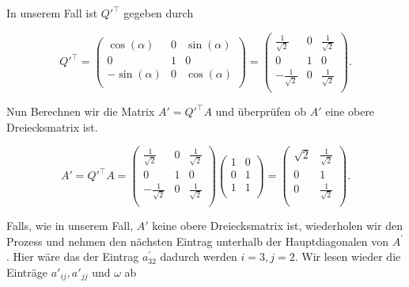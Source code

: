 In unserem Fall ist \( Q'^\top \) gegeben durch

\begin{equation*}
    Q'^\top = \begin{pmatrix}
        \cos(\alpha) & 0 & \sin(\alpha) \\
        0 & 1 & 0 \\
        - \sin(\alpha) & 0 & \cos(\alpha) \\
    \end{pmatrix} =
    \begin{pmatrix}
        \frac{1}{\sqrt{2}} & 0 & \frac{1}{\sqrt{2}} \\
        0 & 1 & 0 \\
        -\frac{1}{\sqrt{2}} & 0 & \frac{1}{\sqrt{2}} \\
    \end{pmatrix}.
\end{equation*}

Nun Berechnen wir die Matrix \( A' = Q'^\top A \) und überprüfen ob \( A' \) eine obere Dreiecksmatrix ist.

\begin{equation*}
    A' = Q'^\top A = 
    \begin{pmatrix}
        \frac{1}{\sqrt{2}} & 0 & \frac{1}{\sqrt{2}} \\
        0 & 1 & 0 \\
        -\frac{1}{\sqrt{2}} & 0 & \frac{1}{\sqrt{2}} \\
    \end{pmatrix}
    \begin{pmatrix}
        1 & 0 \\
        0 & 1 \\
        1 & 1 \\
    \end{pmatrix} = 
    \begin{pmatrix}
        \sqrt{2} & \frac{1}{\sqrt{2}} \\
        0 & 1 \\
        0 & \frac{1}{\sqrt{2}} \\
    \end{pmatrix}.
\end{equation*}

Falls, wie in unserem Fall, \( A' \) keine obere Dreiecksmatrix ist, wiederholen wir den Prozess und nehmen den nächsten Eintrag unterhalb der Hauptdiagonalen von \( A ^\prime \). Hier wäre das der Eintrag \( a^\prime_{32} \) dadurch werden \( i = 3, j = 2 \). Wir lesen wieder die Einträge \( a'_{ij}, a'_{jj} \) und \( \omega \) ab


